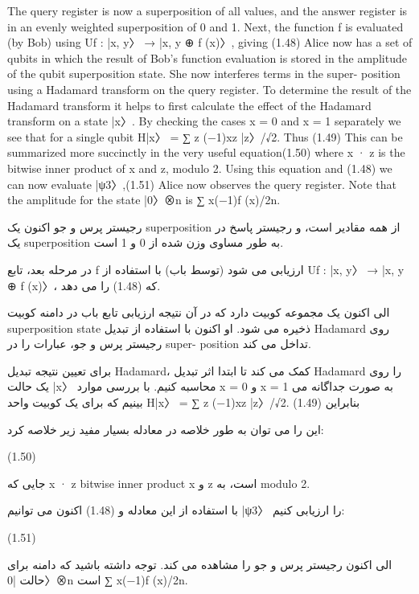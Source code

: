 \documentclass{book}
\begin{document}
	The query register is now a superposition of all values, and the answer register is in an evenly weighted superposition of 0 and 1. Next, the function f is evaluated (by Bob)
	using Uf : |x, y〉 → |x, y ⊕ f (x)〉, giving (1.48) Alice now has a set of qubits in which the result of Bob’s function evaluation is stored
	in the amplitude of the qubit superposition state. She now interferes terms in the super-
	position using a Hadamard transform on the query register. To determine the result of
	the Hadamard transform it helps to first calculate the effect of the Hadamard transform
	on a state |x〉. By checking the cases x = 0 and x = 1 separately we see that for a single
	qubit H|x〉 = ∑
	z (−1)xz |z〉/√2. Thus (1.49) This can be summarized more succinctly in the very useful equation(1.50) where x · z is the bitwise inner product of x and z, modulo 2. Using this equation
	and (1.48) we can now evaluate |ψ3〉,(1.51) Alice now observes the query register. Note that the amplitude for the state |0〉⊗n is
	∑
	x(−1)f (x)/2n. 
	
	
	رجیستر پرس و جو اکنون یک superposition از همه مقادیر است، و رجیستر پاسخ در یک superposition به طور مساوی وزن شده از 0 و 1 است.
	
در مرحله بعد، تابع f ارزیابی می شود (توسط باب) با استفاده از Uf : |x, y〉 → |x, y ⊕ f (x)〉، که (1.48) را می دهد.
	
	الی اکنون یک مجموعه کوبیت دارد که در آن نتیجه ارزیابی تابع باب در دامنه کوبیت superposition state ذخیره می شود. او اکنون با استفاده از تبدیل Hadamard روی رجیستر پرس و جو، عبارات را در super-
	position تداخل می کند.
	
	برای تعیین نتیجه تبدیل Hadamard، کمک می کند تا ابتدا اثر تبدیل Hadamard
	را روی یک حالت |x〉 محاسبه کنیم. با بررسی موارد x = 0 و x = 1 به صورت جداگانه می بینیم که برای یک کوبیت واحد H|x〉 = ∑
	z (−1)xz |z〉/√2. بنابراین (1.49)
	
	این را می توان به طور خلاصه در معادله بسیار مفید زیر خلاصه کرد:
	
	(1.50)
	
	جایی که x · z bitwise inner product x و z است، به modulo 2.
	
	با استفاده از این معادله و (1.48) اکنون می توانیم |ψ3〉 را ارزیابی کنیم:
	
	(1.51)
	
	الی اکنون رجیستر پرس و جو را مشاهده می کند. توجه داشته باشید که دامنه برای حالت |0〉⊗n است
	∑
	x(−1)f (x)/2n.
	
	
	
	
	
	
	
\end{document}
